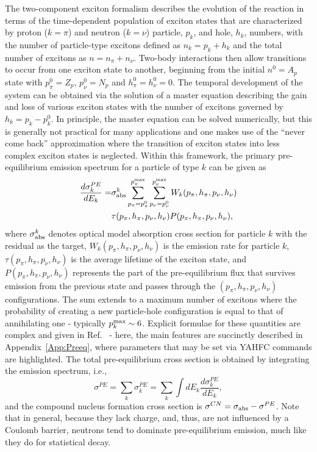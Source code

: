 \documentclass[
10pt,
showpacs,preprintnumbers,footinbib,
amsfonts,amsmath,amssymb,
aps,
prc,twocolumn,groupedaddress,superscriptaddress,
showkeys,
nofootinbib
]{revtex4-1}
\begin{document}
The two-component exciton formalism describes the evolution of the reaction in terms of the time-dependent population of exciton states that are characterized by proton ($k=\pi$) and neutron ($k=\nu$) particle, $p_k$, and hole, $h_k$, numbers, with the number of particle-type excitons defined as  $n_k = p_k+ h_k$ and the total number of excitons as $n = n_\pi+n_\nu$.  Two-body interactions then allow transitions to occur from one exciton state to another, beginning from the initial $n^0=A_p$ state with $p^0_\pi= Z_p$, $p^0_\nu = N_p$ and $h^0_\pi = h^0_\nu = 0$. The temporal development of the system can be obtained via the solution of a master equation describing the gain and loss of various exciton states with the number of excitons governed by $h_k=p_k - p^0_k$. In principle, the master equation can be solved numerically, but this is generally not practical for many applications and one makes use of the ``never come back'' approximation where the transition of exciton states into less complex exciton states is neglected. Within this framework, the primary pre-equilibrium emission spectrum for a particle of type $k$ can be given as
\begin{align}
\frac{d\sigma_k^{PE}}{dE_k} = & \sigma_{\rm abs}^k \sum^{p^{\rm max}_\pi} _{p_\pi=p^0_\pi} \sum^{p^{\rm max}_\nu} _{p_\nu=p^0_\nu} W_k(p_\pi,h_\pi,p_\nu,h_\nu) \notag \\
 & \tau (p_\pi,h_\pi,p_\nu,h_\nu) P (p_\pi,h_\pi,p_\nu,h_\nu),
 \label{eq:PE-Spect}
\end{align}
where $\sigma_{\rm abs}^k$ denotes optical model absorption cross section for particle $k$ with the residual as the target, $W_k(p_\pi,h_\pi,p_\nu,h_\nu)$ is the emission rate for particle $k$, $\tau (p_\pi,h_\pi,p_\nu,h_\nu)$ is the average lifetime of the exciton state, and $P (p_\pi,h_\pi,p_\nu,h_\nu)$ represents the part of the pre-equilibrium flux that survives emission from the previous state and passes through the $(p_\pi,h_\pi,p_\nu,h_\nu)$ configurations. The sum extends to a maximum number of excitons where the probability of creating a new particle-hole configuration is equal to that of annihilating one - typically $p^{\rm max}_k \sim 6$. Explicit formulae for these quantities are complex and given in Ref.~\cite{Koning:2004} - here, the main features are succinctly described in Appendix~\ref{App:Preeq}, where parameters that may be set via YAHFC commands are highlighted. The total pre-equilibrium cross section is obtained by integrating the emission spectrum, i.e.,
\begin{equation}
\sigma^{PE} = \sum_k \sigma^{PE}_k = \sum_k \int dE_k \frac{d\sigma_k^{PE}}{dE_k},
\end{equation}
and the compound nucleus formation cross section is $\sigma^{CN} = \sigma_{\rm abs} - \sigma^{PE}$. Note that in general, because they lack charge, and, thus, are not influenced by a Coulomb barrier, neutrons tend to dominate pre-equilibrium emission, much like they do for statistical decay.
\end{document}
